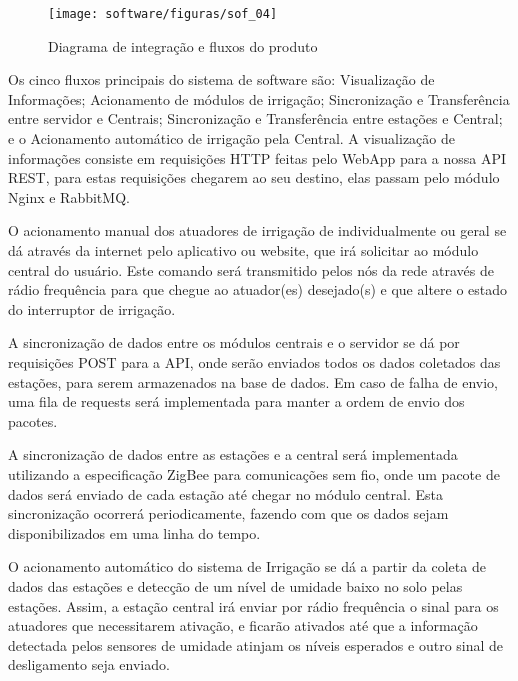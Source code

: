 \begin{figure}[H]
	\centering
	\texttt{[image: software/figuras/sof\_04]}
	\caption{Diagrama de integração e fluxos do produto}
\end{figure}

Os cinco fluxos principais do sistema de software são: Visualização de Informações; Acionamento de módulos de irrigação; Sincronização e Transferência entre servidor e Centrais; Sincronização e Transferência entre estações e Central; e o Acionamento automático de irrigação pela Central.
A visualização de informações consiste em requisições HTTP feitas pelo WebApp para a nossa API REST, para estas requisições chegarem ao seu destino, elas passam pelo módulo Nginx e RabbitMQ.

O acionamento manual dos atuadores de irrigação de individualmente ou geral se dá através da internet pelo aplicativo ou website, que irá solicitar ao módulo central do usuário. Este comando será transmitido pelos nós da rede através de rádio frequência para que chegue ao atuador(es) desejado(s) e que altere o estado do interruptor de irrigação.  

A sincronização de dados entre os módulos centrais e o servidor se dá por requisições POST para a API, onde serão enviados todos os dados coletados das estações, para serem armazenados na base de dados. Em caso de falha de envio, uma fila de requests será implementada para manter a ordem de envio dos pacotes.

A sincronização de dados entre as estações e a central será implementada utilizando a especificação ZigBee para comunicações sem fio, onde um pacote de dados será enviado de cada estação até chegar no módulo central. Esta sincronização ocorrerá periodicamente, fazendo com que os dados sejam disponibilizados em uma linha do tempo.

O acionamento automático do sistema de Irrigação se dá a partir da coleta de dados das estações e detecção de um nível de umidade baixo no solo pelas estações. Assim, a estação central irá enviar por rádio frequência o sinal para os atuadores que necessitarem ativação, e ficarão ativados até que a informação detectada pelos sensores de umidade atinjam os níveis esperados e outro sinal de desligamento seja enviado.
